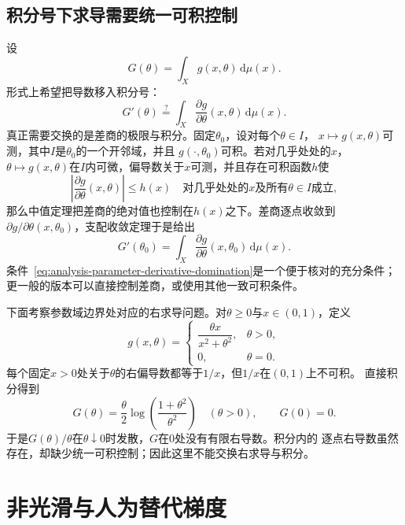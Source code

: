 \subsection{积分号下求导需要统一可积控制}

设
\[   G(\theta)=\int_X g(x,\theta)\,\mathrm{d}\mu(x). \]
形式上希望把导数移入积分号：
\[   G'(\theta)   \stackrel{?}{=}   \int_X\frac{\partial g}{\partial\theta}(x,\theta)\,\mathrm{d}\mu(x). \]
真正需要交换的是差商的极限与积分。固定$\theta_0$，设对每个$\theta\in I$，
$x\mapsto g(x,\theta)$可测，其中$I$是$\theta_0$的一个开邻域，并且
$g(\cdot,\theta_0)$可积。若对几乎处处的$x$，
$\theta\mapsto g(x,\theta)$在$I$内可微，偏导数关于$x$可测，并且存在可积函数$h$使
\begin{equation}
  \left|
    \frac{\partial g}{\partial\theta}(x,\theta)
  \right|
  \leq h(x)
  \quad
  \text{对几乎处处的$x$及所有$\theta\in I$成立},
\label{eq:analysis-parameter-derivative-domination}
\end{equation}
那么中值定理把差商的绝对值也控制在$h(x)$之下。差商逐点收敛到 $\partial g/\partial\theta(x,\theta_0)$，支配收敛定理于是给出
\begin{equation}
  G'(\theta_0)
  =
  \int_X
  \frac{\partial g}{\partial\theta}(x,\theta_0)
  \,\mathrm{d}\mu(x).
\label{eq:analysis-differentiate-under-integral}
\end{equation}
条件~\eqref{eq:analysis-parameter-derivative-domination}是一个便于核对的充分条件； 更一般的版本可以直接控制差商，或使用其他一致可积条件。
\begin{example}[参数积分中的控制函数失效]
\label{ex:analysis-parameter-integral-failure}
下面考察参数域边界处对应的右求导问题。对$\theta\geq0$与$x\in(0,1)$，定义
\[   g(x,\theta)   =
\begin{cases}     \dfrac{\theta x}{x^2+\theta^2}, & \theta>0,\\[5pt]     0, & \theta=0.
\end{cases} \]
每个固定$x>0$处关于$\theta$的右偏导数都等于$1/x$，但$1/x$在$(0,1)$上不可积。
直接积分得到
\[   G(\theta)   =   \frac{\theta}{2}   \log\left(\frac{1+\theta^2}{\theta^2}\right)   \quad(\theta>0),   \qquad G(0)=0. \]
于是$G(\theta)/\theta$在$\theta\downarrow0$时发散，$G$在$0$处没有有限右导数。积分内的
逐点右导数虽然存在，却缺少统一可积控制；因此这里不能交换右求导与积分。
\end{example}
\section{非光滑与人为替代梯度}
\label{sec:analysis-nonsmooth-surrogate-gradient}
